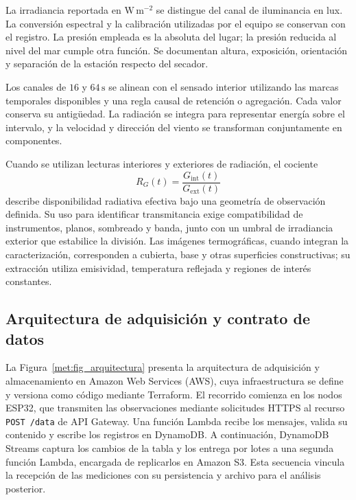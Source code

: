 La irradiancia reportada en $\mathrm{W\,m^{-2}}$ se distingue del canal de iluminancia en lux. La conversión espectral y la calibración utilizadas por el equipo se conservan con el registro. La presión empleada es la absoluta del lugar; la presión reducida al nivel del mar cumple otra función. Se documentan altura, exposición, orientación y separación de la estación respecto del secador.

Los canales de $16$ y $64\,\mathrm s$ se alinean con el sensado interior utilizando las marcas temporales disponibles y una regla causal de retención o agregación. Cada valor conserva su antigüedad. La radiación se integra para representar energía sobre el intervalo, y la velocidad y dirección del viento se transforman conjuntamente en componentes.

Cuando se utilizan lecturas interiores y exteriores de radiación, el cociente
\begin{equation}
R_G(t)=\frac{G_{\mathrm{int}}(t)}{G_{\mathrm{ext}}(t)}
\label{met:cociente_radiativo}
\end{equation}
describe disponibilidad radiativa efectiva bajo una geometría de observación definida. Su uso para identificar transmitancia exige compatibilidad de instrumentos, planos, sombreado y banda, junto con un umbral de irradiancia exterior que estabilice la división. Las imágenes termográficas, cuando integran la caracterización, corresponden a cubierta, base y otras superficies constructivas; su extracción utiliza emisividad, temperatura reflejada y regiones de interés constantes.

\subsection{Arquitectura de adquisición y contrato de datos}
\label{met:arquitectura}

La Figura~\ref{met:fig_arquitectura} presenta la arquitectura de adquisición y almacenamiento en Amazon Web Services (AWS), cuya infraestructura se define y versiona como código mediante Terraform. El recorrido comienza en los nodos ESP32, que transmiten las observaciones mediante solicitudes HTTPS al recurso \texttt{POST /data} de API Gateway. Una función Lambda recibe los mensajes, valida su contenido y escribe los registros en DynamoDB. A continuación, DynamoDB Streams captura los cambios de la tabla y los entrega por lotes a una segunda función Lambda, encargada de replicarlos en Amazon S3. Esta secuencia vincula la recepción de las mediciones con su persistencia y archivo para el análisis posterior.

